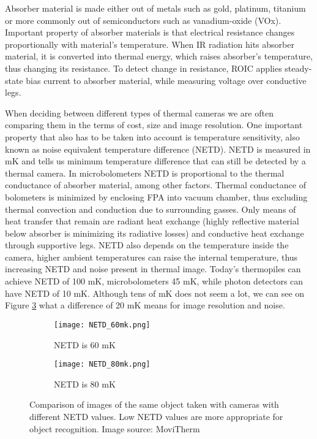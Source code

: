 Absorber material is made either out of metals such as gold, platinum, titanium or more commonly out of semiconductors such as vanadium-oxide (VOx)\cite{thermal_article}.
Important property of absorber materials is that electrical resistance changes proportionally with material's temperature\cite{thermal_book}.
When IR radiation hits absorber material, it is converted into thermal energy, which raises absorber's temperature, thus changing its resistance.
To detect change in resistance, ROIC applies steady-state bias current to absorber material, while measuring voltage over conductive legs\cite{thermal_book}. 

When deciding between different types of thermal cameras we are often comparing them in the terms of cost, size and image resolution.
One important property that also has to be taken into account is temperature sensitivity, also known as noise equivalent temperature difference (NETD).
NETD is measured in \si{\milli\kelvin} and tells us minimum temperature difference that can still be detected by a thermal camera.
In microbolometers NETD is proportional to the thermal conductance of absorber material, among other factors\cite{thermal_book}.
Thermal conductance of bolometers is minimized by enclosing FPA into vacuum chamber, thus excluding thermal convection and conduction due to surrounding gasses.
Only means of heat transfer that remain are radiant heat exchange (highly reflective material below absorber is minimizing its radiative losses) and conductive heat exchange through supportive legs.
NETD also depends on the temperature inside the camera, higher ambient temperatures can raise the internal temperature, thus increasing NETD and noise present in thermal image.
Today's thermopiles can achieve NETD of 100 \si{\milli\kelvin}, microbolometers 45 \si{\milli\kelvin}, while photon detectors can have NETD of 10 \si{\milli\kelvin}.
Although tens of \si{\milli\kelvin} does not seem a lot, we can see on Figure \ref{NETD} what a difference of 20 \si{\milli\kelvin} means for image resolution and noise.
\newline

\begin{figure}[ht]
    \begin{subfigure}{0.5\textwidth}
        \centering
        \texttt{[image: NETD\_60mk.png]} 
        \caption{NETD is 60 \si{\milli\kelvin}}
        \label{NETD_60mk}
    \end{subfigure}
    \begin{subfigure}{0.5\textwidth}
        \centering
        \texttt{[image: NETD\_80mk.png]}
        \caption{NETD is 80 \si{\milli\kelvin}}
        \label{NETD_80mk}
    \end{subfigure}

    \caption{Comparison of images of the same object taken with cameras with different NETD values. Low NETD values are more appropriate for object recognition. Image source: MoviTherm \cite{NETD}}
    \label{NETD}
\end{figure}


